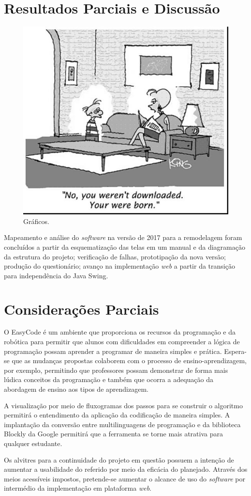 \documentclass[12pt]{article}
\begin{document}
\section{Resultados Parciais e Discussão}
	\begin{figure}[h]
		\centering
		\includegraphics[scale=0.2]{fig1.jpg}
		\caption{Gráficos.}
		\label{fig3}
	\end{figure}
Mapeamento e análise do \textit{software} na versão de 2017 para a remodelagem foram concluídos a partir da esquematização das telas em um manual e da diagramação da estrutura do projeto; verificação de falhas, prototipação da nova versão; produção do questionário; avanço na implementação \textit{web} a partir da transição para independência do Java Swing.

\section{Considerações Parciais}
O EasyCode é um ambiente que proporciona os recursos da programação e da robótica para permitir que alunos com dificuldades em compreender a lógica de programação possam aprender a programar de maneira simples e prática. Espera-se que as mudanças propostas colaborem com o processo de ensino-aprendizagem, por exemplo, permitindo que professores possam demonstrar de forma mais lúdica conceitos da programação e também que ocorra a adequação da abordagem de ensino aos tipos de aprendizagem. 
\par A visualização por meio de fluxogramas dos passos para se construir o algoritmo permitirá o entendimento da aplicação da codificação de maneira simples. A implantação da conversão entre multilinguagens de programação e da biblioteca Blockly da Google permitirá que a ferramenta se torne mais atrativa para qualquer estudante.
\par Os alvitres para a continuidade do projeto em questão possuem a intenção de aumentar a usabilidade do referido por meio da eficácia do planejado. Através dos meios acessíveis impostos, pretende-se aumentar o alcance de uso do \textit{software} por intermédio da implementação em plataforma \textit{web}. 



\end{document}
